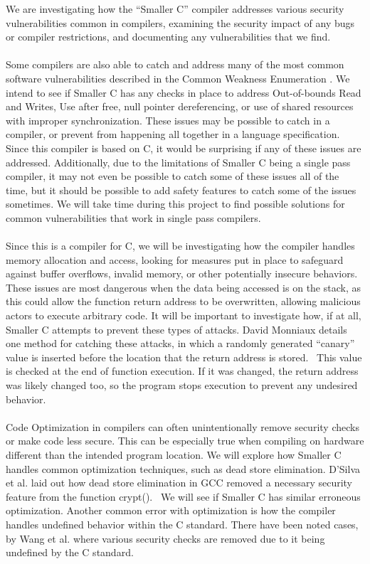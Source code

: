 \documentclass[sigconf, anonymous]{acmart}
\begin{document}
We are investigating how the “Smaller C” compiler addresses various security vulnerabilities common in compilers, examining the security impact of any bugs or compiler restrictions, and documenting any vulnerabilities that we find.
\\\\
Some compilers are also able to catch and address many of the most common software vulnerabilities described in the Common Weakness Enumeration \cite{CWE:2023}. We intend to see if Smaller C has any checks in place to address Out-of-bounds Read and Writes, Use after free, null pointer dereferencing, or use of shared resources with improper synchronization. These issues may be possible to catch in a compiler, or prevent from happening all together in a language specification. Since this compiler is based on C, it would be surprising if any of these issues are addressed. Additionally, due to the limitations of Smaller C being a single pass compiler, it may not even be possible to catch some of these issues all of the time, but it should be possible to add safety features to catch some of the issues sometimes. We will take time during this project to find possible solutions for common vulnerabilities that work in single pass compilers.
\\\\
Since this is a compiler for C, we will be investigating how the compiler handles memory allocation and access, looking for measures put in place to safeguard against buffer overflows, invalid memory, or other potentially insecure behaviors. These issues are most dangerous when the data being accessed is on the stack, as this could allow the function return address to be overwritten, allowing malicious actors to execute arbitrary code. It will be important to investigate how, if at all, Smaller C attempts to prevent these types of attacks. David Monniaux details one method for catching these attacks, in which a randomly generated “canary” value is inserted before the location that the return address is stored.~\cite{Monniaux:Memory} This value is checked at the end of function execution. If it was changed, the return address was likely changed too, so the program stops execution to prevent any undesired behavior.
\\\\
Code Optimization in compilers can often unintentionally remove security checks or make code less secure. This can be especially true when compiling on hardware different than the intended program location. We will explore how Smaller C handles common optimization techniques, such as dead store elimination. D’Silva et al. laid out how dead store elimination in GCC removed a necessary security feature from the function crypt().~\cite{DSilva:Correctness} We will see if Smaller C has similar erroneous optimization. Another common error with optimization is how the compiler handles undefined behavior within the C standard. There have been noted cases, by Wang et al. where various security checks are removed due to it being undefined by the C standard.~\cite{Wang:Optimization}
\end{document}
